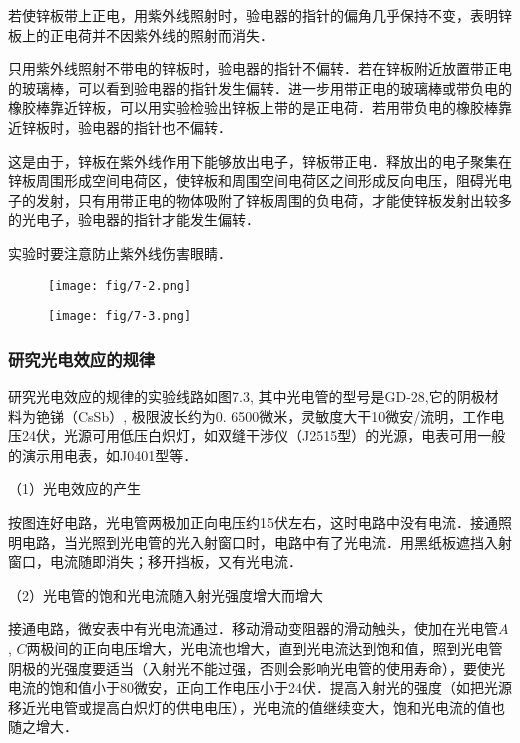 若使锌板带上正电，用紫外线照射时，验电器的指针的偏角几乎保持不变，表明锌板上的正电荷并不因紫外线的照射而消失．

只用紫外线照射不带电的锌板时，验电器的指针不偏转．若在锌板附近放置带正电的玻璃棒，可以看到验电器的指针发生偏转．进一步用带正电的玻璃棒或带负电的橡胶棒靠近锌板，可以用实验检验出锌板上带的是正电荷．若用带负电的橡胶棒靠近锌板时，验电器的指针也不偏转．

这是由于，锌板在紫外线作用下能够放出电子，锌板带正电．释放出的电子聚集在锌板周围形成空间电荷区，使锌板和周围空间电荷区之间形成反向电压，阻碍光电子的发射，只有用带正电的物体吸附了锌板周围的负电荷，才能使锌板发射出较多的光电子，验电器的指针才能发生偏转．

实验时要注意防止紫外线伤害眼睛．

\begin{figure}[htp]\centering
    \begin{minipage}[t]{0.48\textwidth}
    \centering
    \texttt{[image: fig/7-2.png]}
    \caption{}
    \end{minipage}
    \begin{minipage}[t]{0.48\textwidth}
    \centering
    \texttt{[image: fig/7-3.png]}
    \caption{}
    \end{minipage}
    \end{figure}

\subsubsection{研究光电效应的规律}

研究光电效应的规律的实验线路如图7.3, 其中光电管的型号是GD-28,它的阴极材料为铯锑（CsSb）, 极限波长约为0. 6500微米，灵敏度大干10微安/流明，工作电压24伏，光源可用低压白炽灯，如双缝干涉仪（J2515型）的光源，电表可用一般的演示用电表，如J0401型等．


（1）光电效应的产生

按图连好电路，光电管两极加正向电压约15伏左右，这时电路中没有电流．接通照明电路，当光照到光电管的光入射窗口时，电路中有了光电流．用黑纸板遮挡入射窗口，电流随即消失；移开挡板，又有光电流．

（2）光电管的饱和光电流随入射光强度增大而增大

接通电路，微安表中有光电流通过．移动滑动变阻器的滑动触头，使加在光电管$A$, $C$两极间的正向电压增大，光电流也增大，直到光电流达到饱和值，照到光电管阴极的光强度要适当（入射光不能过强，否则会影响光电管的使用寿命），要使光电流的饱和值小于80微安，正向工作电压小于24伏．提高入射光的强度（如把光源移近光电管或提高白炽灯的供电电压），光电流的值继续变大，饱和光电流的值也随之增大．

